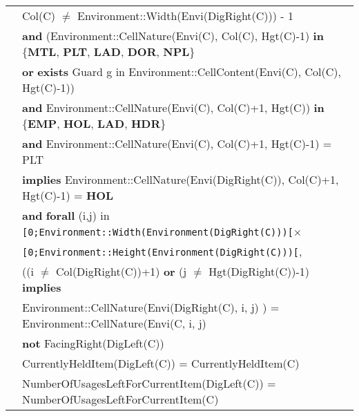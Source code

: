 \documentclass[7pt]{article}
\begin{document}
\begin{tabular}{rl}
& Col(C) $\neq$ Environment::Width(Envi(DigRight(C))) - 1 \\
& \quad \textbf{and} (Environment::CellNature(Envi(C), Col(C), Hgt(C)-1) \textbf{in} \{\textbf{MTL}, \textbf{PLT}, \textbf{LAD}, \textbf{DOR}, \textbf{NPL}\} \\
& \quad\quad \textbf{or} \textbf{exists} Guard g {in} Environment::CellContent(Envi(C), Col(C), Hgt(C)-1)) \\
& \quad \textbf{and} Environment::CellNature(Envi(C), Col(C)+1, Hgt(C)) \textbf{in} \{\textbf{EMP}, \textbf{HOL}, \textbf{LAD}, \textbf{HDR}\} \\
& \quad \textbf{and}  Environment::CellNature(Envi(C), Col(C)+1, Hgt(C)-1) = PLT \\
& \quad \textbf{implies} Environment::CellNature(Envi(DigRight(C)), Col(C)+1, Hgt(C)-1) = \textbf{HOL} \\
& \quad\quad \textbf{and} {\textbf{forall}} (i,j) {in} \texttt{[0;Environment::Width(Environment(DigRight(C)))[}× \\ & \quad\quad\quad\quad\quad\quad\quad\quad\quad\quad\texttt{[0;Environment::Height(Environment(DigRight(C)))[}, \\
       & \quad\quad\quad\quad\quad\quad ((i $\neq$ Col(DigRight(C))+1) \textbf{or}  (j $\neq$ Hgt(DigRight(C))-1) \textbf{implies} \\
       & \quad\quad\quad\quad\quad\quad\quad Environment::CellNature(Envi(DigRight(C), i, j) ) = Environment::CellNature(Envi(C, i, j) \\
& \textbf{not} FacingRight(DigLeft(C)) \\
& CurrentlyHeldItem(DigLeft(C)) = CurrentlyHeldItem(C) \\
& NumberOfUsagesLeftForCurrentItem(DigLeft(C)) = NumberOfUsagesLeftForCurrentItem(C) \\

\end{tabular}
\newpage
\end{document}
